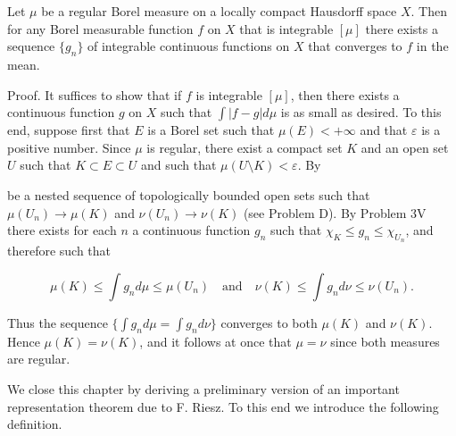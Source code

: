 Let $\mu$ be a regular Borel measure on a locally compact Hausdorff space $X$. Then for any Borel measurable function $f$ on $X$ that is integrable $[\mu]$ there exists a sequence $\{g_n\}$ of integrable continuous functions on $X$ that converges to $f$ in the mean.

Proof. It suffices to show that if $f$ is integrable $[\mu]$, then there exists a continuous function $g$ on $X$ such that $\int |f - g| d\mu$ is as small as desired. To this end, suppose first that $E$ is a Borel set such that $\mu(E) < +\infty$ and that $\varepsilon$ is a positive number. Since $\mu$ is regular, there exist a compact set $K$ and an open set $U$ such that $K \subset E \subset U$ and such that $\mu(U \setminus K) < \varepsilon$. By

be a nested sequence of topologically bounded open sets such that $\mu(U_n) \rightarrow \mu(K)$ and $\nu(U_n) \rightarrow \nu(K)$ (see Problem D). By Problem 3V there exists for each $n$ a continuous function $g_n$ such that $\chi_K \leq g_n \leq \chi_{U_n}$, and therefore such that

$$\mu(K) \leq \int g_n d\mu \leq \mu(U_n) \quad \text{and} \quad \nu(K) \leq \int g_n d\nu \leq \nu(U_n).$$

Thus the sequence $\{\int g_n d\mu = \int g_n d\nu\}$ converges to both $\mu(K)$ and $\nu(K)$. Hence $\mu(K) = \nu(K)$, and it follows at once that $\mu = \nu$ since both measures are regular.

We close this chapter by deriving a preliminary version of an important representation theorem due to F. Riesz. To this end we introduce the following definition.
